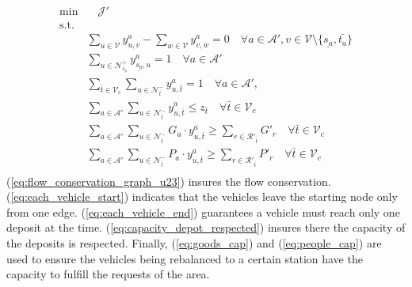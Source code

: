 \begin{align}
	\text{min}&  \quad \mathcal{J'} \nonumber \\
	\text{s.t.} &\nonumber\\
	&\sum_{u \in \mathcal{V}} y^a_{u, v} - \sum_{w \in \mathcal{V}} y^a_{v, w} = 0 \quad \forall a \in \mathcal{A'}, v \in \mathcal{V} \setminus \{\underline{s_a}, \bar{t_a}\} \label{eq:flow_conservation_graph_u23} \\	
	&\sum_{ u \in \mathcal{N}^+_{\underline{s_a}} }y^a_{ \underline{s_a},u} = 1 \quad \forall a \in \mathcal{A'} \label{eq:each_vehicle_start}\\
	&\sum_{\bar{t} \in \mathcal{V}_c}\sum_{ u \in \mathcal{N}^-_{\bar{t}} }y^a_{u, \bar{t}} = 1 \quad \forall a \in \mathcal{A'},  \label{eq:each_vehicle_end}\\
	&\sum_{a \in \mathcal{A'}}\sum_{u \in \mathcal{N}^-_{\bar{t}} } y^a_{u, \bar{t}} \leq z_{\bar{t}} \quad \forall \bar{t} \in \mathcal{V}_c \label{eq:capacity_depot_respected}\\
	&\sum_{a \in \mathcal{A'}}\sum_{u \in \mathcal{N}^-_{\bar{t}} } G_a \cdot y^a_{u, \bar{t}} \ge \sum_{r \in \mathcal{R'}_{\bar{t}}} G'_r \quad \forall \bar{t} \in \mathcal{V}_c \label{eq:goods_cap}\\
	&\sum_{a \in \mathcal{A'}}\sum_{u \in \mathcal{N}^-_{\bar{t}} } P_a \cdot y^a_{u, \bar{t}} \ge \sum_{r \in \mathcal{R'}_{\bar{t}}} P'_r \quad \forall \bar{t} \in \mathcal{V}_c \label{eq:people_cap}\\
	\nonumber%
\end{align}
(\ref{eq:flow_conservation_graph_u23}) insures the flow conservation. (\ref{eq:each_vehicle_start}) indicates that the vehicles leave the starting node only from one edge. (\ref{eq:each_vehicle_end}) guarantees a vehicle must reach only one deposit at the time. (\ref{eq:capacity_depot_respected}) insures there the capacity of the deposits is respected. Finally, (\ref{eq:goods_cap}) and (\ref{eq:people_cap}) are used to ensure the vehicles being rebalanced to a certain station have the capacity to fulfill the requests of the area. 

